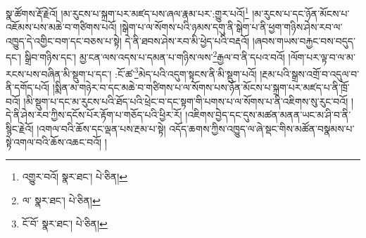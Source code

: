 སྣ་ཚོགས་རྡོ་རྗེའོ། །མ་རུངས་པ་སྐྲག་པར་མཛད་པས་ཞལ་རྣམ་པར་:གྱུར་པའོ།\footnote{འགྱུར་བའོ།  སྣར་ཐང་།  པེ་ཅིན། } །མ་རུངས་པ་དང་ཉོན་མོངས་པ་འཇོམས་པས་མཆེ་བ་གཙིགས་པའོ། །སྒེག་པ་ལ་སོགས་པའི་ཉམས་དགུ་ནི་སྒེག་པ་ནི་ཕྱག་གཉིས་ཤེས་རབ་ལ་འཁྱུད་དེ་འགྱིང་བག་དང་བཅས་པ་སྟེ། དེ་ནི་ཐབས་ཤེས་རབ་མི་ཕྱེད་པའི་བརྡའོ། །ཞབས་གཡས་བརྐྱང་བས་བདུད་དང་། སྒྲིབ་གཉིས་དང་། མྱ་ངན་ལས་འདས་པ་དམན་པ་གཉིས་ལས་\footnote{ལ་  སྣར་ཐང་།  པེ་ཅིན། }རྒྱལ་བ་ནི་དཔའ་བའོ། །ལོག་པར་ལྟ་བ་ལ་མ་རངས་པས་བཞིན་མི་སྡུག་པ་དང་། :ངོ་ཚ་\footnote{ངོ་བོ་  སྣར་ཐང་།  པེ་ཅིན། }མེད་པའི་འདུག་སྟངས་ནི་མི་སྡུག་པའོ། །རྔམ་པའི་སྒྲས་འགྲོ་བ་འདུལ་བ་ནི་དགོད་པའོ། །སྨིན་མ་གཉེར་བ་དང་མཆེ་བ་གཙིགས་པ་ལ་སོགས་པས་ཉོན་མོངས་པ་སྐྲག་པར་མཛད་པ་ནི་ཁྲོ་བའོ། །མི་སྡུག་པ་དང་མ་རུངས་པའི་ཐོད་པའི་ཕྲེང་བ་དང་སྟག་གི་པགས་པ་ལ་སོགས་པ་ནི་འཇིགས་སུ་རུང་བའོ། །དེ་ནི་ཤེས་རབ་ཀྱིས་དངོས་པོར་རྟོག་པ་གཅོད་པའི་ཕྱིར་རོ། །འཇིགས་བྱེད་དང་དུས་མཚན་མནན་ཡང་མ་ཤི་བ་ནི་སྙིང་རྗེའོ། །འགལ་བའི་ཆོས་དང་ལྡན་པས་རྔམ་པ་སྟེ། འདོད་ཆགས་ཀྱིས་འཁྱུད་ལ་ཞེ་སྡང་གིས་མཚོན་བསྣམས་པ་སྟེ་འགལ་བའི་ཆོས་འཆང་བའོ། །
